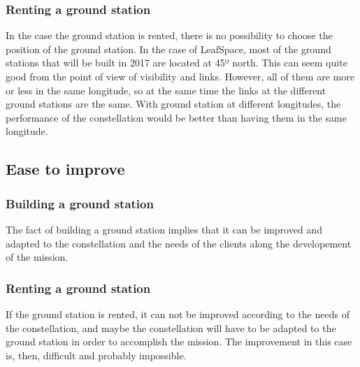 \subsubsection{Renting a ground station}
In the case the ground station is rented, there is no possibility to choose the position of the ground station. In the case of LeafSpace, most of the ground stations that will be built in 2017 are located at 45º north. This can seem quite good from the point of view of visibility and links. However, all of them are more or less in the same longitude, so at the same time the links at the different ground stations are the same. With ground station at different longitudes, the performance of the constellation would be better than having them in the same longitude.
\subsection{Ease to improve}
\subsubsection{Building a ground station}
The fact of building a ground station implies that it can be improved and adapted to the constellation and the needs of the clients along the developement of the mission. 
\subsubsection{Renting a ground station}
If the ground station is rented, it can not be improved according to the needs of the constellation, and maybe the constellation will have to be adapted to the ground station in order to accomplish the mission. The improvement in this case is, then, difficult and probably impossible.
